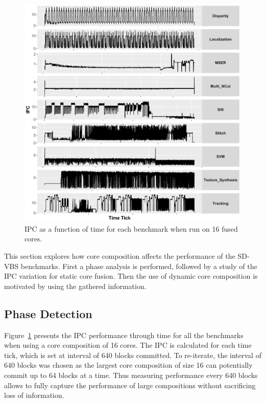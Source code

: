 
\begin{figure}[t]
    \centering
    \includegraphics[width=1\textwidth]{cases-paper/graphics/Exploration/ipcs_16_3.pdf}
    \caption{IPC as a function of time for each benchmark when run on 16 fused cores.}
    \label{fig:sxt}
	\vspace{2em}
\end{figure}

This section explores how core composition affects the performance of the SD-VBS benchmarks.
First a phase analysis is performed, followed by a study of the IPC variation for static core fusion.
Then the use of dynamic core composition is motivated by using the gathered information.


\subsection{Phase Detection}
Figure~\ref{fig:sxt} presents the IPC performance through time for all the benchmarks when using a core composition of 16 cores.
The IPC is calculated for each time tick, which is set at interval of 640 blocks committed.
To re-iterate, the interval of 640 blocks was chosen as the largest core composition of size 16 can potentially commit up to 64 blocks at a time.
Thus measuring performance every 640 blocks allows to fully capture the performance of large compositions without sacrificing loss of information.

